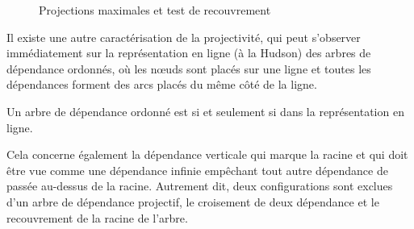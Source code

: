 \begin{figure}
\caption{\label{fig:ABproj}Projections maximales et test de recouvrement}
\end{figure}


Il existe une autre caractérisation de la projectivité, qui peut s’observer immédiatement sur la représentation en ligne (à la Hudson) des arbres de dépendance ordonnés, où les nœuds sont placés sur une ligne et toutes les dépendances forment des arcs placés du même côté de la ligne.

{Un arbre de dépendance ordonné est  si et seulement si  dans la représentation en ligne.}

Cela concerne également la dépendance verticale qui marque la racine et qui doit être vue comme une dépendance infinie empêchant tout autre dépendance de passée au-dessus de la racine. Autrement dit,  deux configurations sont exclues d’un arbre de dépendance projectif, le croisement de deux dépendance et le recouvrement de la racine de l'arbre.

